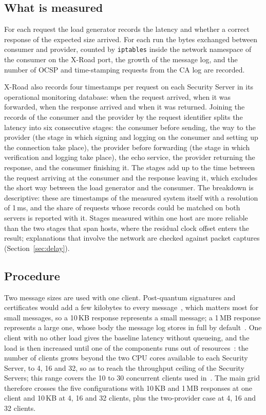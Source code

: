 \documentclass[conference,a4paper]{IEEEtran}
\begin{document}
\subsection{What is measured}\label{sec:measured}

For each request the load generator records the latency and whether a correct response of the
expected size arrived. For each run the bytes exchanged between consumer and provider,
counted by \texttt{iptables} inside the network namespace of the consumer on the X-Road port, the
growth of the message log, and the number of OCSP and time-stamping requests from the CA log are
recorded.

X-Road also records four timestamps per request on each Security Server in its operational
monitoring database: when the request arrived, when it was forwarded, when the response arrived and
when it was returned. Joining the records of the consumer and the provider by the request identifier
splits the latency into six consecutive stages: the consumer before sending, the way to the provider
(the
stage in which signing and logging on the consumer and setting up the connection take place), the
provider before forwarding (the stage in which verification and
logging take place), the echo service, the provider returning the response,
and the consumer finishing it. The stages add up to the time between the request arriving at the
consumer and the response leaving it, which excludes the short way between the load generator and
the consumer. The breakdown is descriptive:
these are timestamps of the measured system itself with a resolution of 1\,ms, and the share of
requests whose records could be matched on both servers is reported with it. Stages measured within
one host are more reliable than the two stages that span hosts, where the residual clock offset enters
the result; explanations that involve the network are checked against packet captures
(Section~\ref{sec:delay}).

\subsection{Procedure}\label{sec:proc}

Two message sizes are used with one client. Post-quantum signatures and certificates would add a few
kilobytes to every message~\cite{snetkov2023}, which matters most for small messages, so a 10\,KB
response represents a small message; a 1\,MB response represents a large one, whose body the message log stores in full
by default~\cite{xroadsyspar}. One client with no other load gives the baseline latency without
queueing, and the load is then increased until one of the components runs out of
resources~\cite{taklai2020}: the number of clients grows beyond the two CPU cores available to each
Security Server, to 4, 16 and 32, so as to reach the throughput ceiling of the Security Servers; this
range covers the 10 to 30 concurrent clients used in~\cite{taklai2020}. The main grid therefore crosses the five configurations with 10\,KB and 1\,MB
responses at one client and 10\,KB at 4, 16 and 32 clients, plus the two-provider case at 4, 16 and 32 clients.
\end{document}

